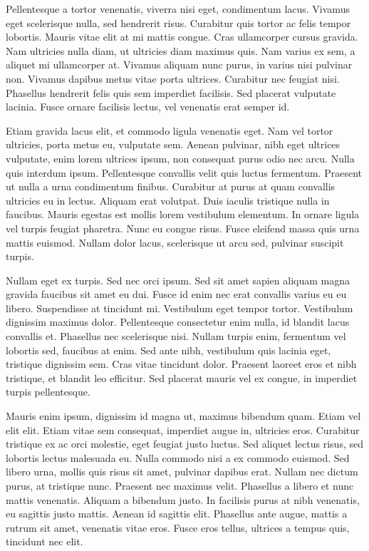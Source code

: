 Pellentesque a tortor venenatis, viverra nisi eget, condimentum lacus. Vivamus eget scelerisque nulla, sed hendrerit risus. Curabitur quis tortor ac felis tempor lobortis. Mauris vitae elit at mi mattis congue. Cras ullamcorper cursus gravida. Nam ultricies nulla diam, ut ultricies diam maximus quis. Nam varius ex sem, a aliquet mi ullamcorper at. Vivamus aliquam nunc purus, in varius nisi pulvinar non. Vivamus dapibus metus vitae porta ultrices. Curabitur nec feugiat nisi. Phasellus hendrerit felis quis sem imperdiet facilisis. Sed placerat vulputate lacinia. Fusce ornare facilisis lectus, vel venenatis erat semper id.

Etiam gravida lacus elit, et commodo ligula venenatis eget. Nam vel tortor ultricies, porta metus eu, vulputate sem. Aenean pulvinar, nibh eget ultrices vulputate, enim lorem ultrices ipsum, non consequat purus odio nec arcu. Nulla quis interdum ipsum. Pellentesque convallis velit quis luctus fermentum. Praesent ut nulla a urna condimentum finibus. Curabitur at purus at quam convallis ultricies eu in lectus. Aliquam erat volutpat. Duis iaculis tristique nulla in faucibus. Mauris egestas est mollis lorem vestibulum elementum. In ornare ligula vel turpis feugiat pharetra. Nunc eu congue risus. Fusce eleifend massa quis urna mattis euismod. Nullam dolor lacus, scelerisque ut arcu sed, pulvinar suscipit turpis.

Nullam eget ex turpis. Sed nec orci ipsum. Sed sit amet sapien aliquam magna gravida faucibus sit amet eu dui. Fusce id enim nec erat convallis varius eu eu libero. Suspendisse at tincidunt mi. Vestibulum eget tempor tortor. Vestibulum dignissim maximus dolor. Pellentesque consectetur enim nulla, id blandit lacus convallis et. Phasellus nec scelerisque nisi. Nullam turpis enim, fermentum vel lobortis sed, faucibus at enim. Sed ante nibh, vestibulum quis lacinia eget, tristique dignissim sem. Cras vitae tincidunt dolor. Praesent laoreet eros et nibh tristique, et blandit leo efficitur. Sed placerat mauris vel ex congue, in imperdiet turpis pellentesque.

Mauris enim ipsum, dignissim id magna ut, maximus bibendum quam. Etiam vel elit elit. Etiam vitae sem consequat, imperdiet augue in, ultricies eros. Curabitur tristique ex ac orci molestie, eget feugiat justo luctus. Sed aliquet lectus risus, sed lobortis lectus malesuada eu. Nulla commodo nisi a ex commodo euismod. Sed libero urna, mollis quis risus sit amet, pulvinar dapibus erat. Nullam nec dictum purus, at tristique nunc. Praesent nec maximus velit. Phasellus a libero et nunc mattis venenatis. Aliquam a bibendum justo. In facilisis purus at nibh venenatis, eu sagittis justo mattis. Aenean id sagittis elit. Phasellus ante augue, mattis a rutrum sit amet, venenatis vitae eros. Fusce eros tellus, ultrices a tempus quis, tincidunt nec elit.


